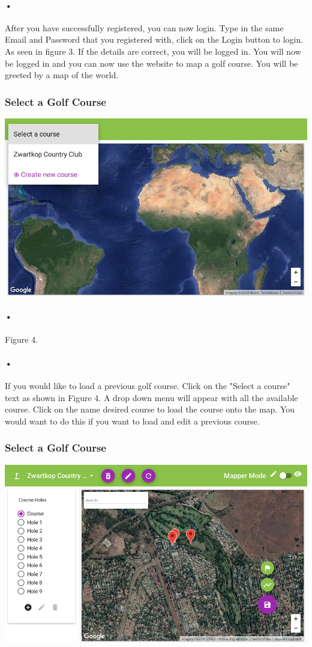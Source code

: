\documentclass{article}
\begin{document}
	\paragraph{•}
	After you have successfully registered, you can now login. Type in the same Email and Password that you registered with, click on the Login button to login. As seen in figure 3. If the details are correct, you will be logged in. You will now be logged in and you can now use the website to map a golf course. You will be greeted by a map of the world.	
   
    
	\subsubsection{Select a Golf Course}
	 \includegraphics[scale=1.5]{3_create_course}
	\paragraph{•}
    Figure 4.    
	\paragraph{•}    
	If you would like to load a previous golf course. Click on the "Select a course" text as shown in Figure 4. A drop down menu will appear with all the available course. Click on the name desired course to load the course onto the map. You would want to do this if you want to load and edit a previous course.
    
    \subsubsection{Select a Golf Course}
	 \includegraphics[scale=1.5]{5_selected}
\end{document}
